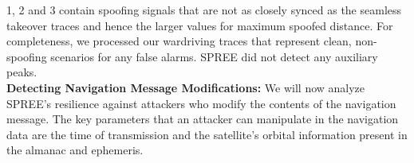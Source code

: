 \documentclass[letterpaper,twocolumn,10pt]{article}
\newcommand{\rxname}{SPREE\xspace}
\begin{document}
1, 2 and 3 contain spoofing signals that are not as closely synced as the seamless takeover traces and hence the larger values for maximum spoofed distance. For completeness, we processed our wardriving traces that represent clean, non-spoofing scenarios for any false alarms. \rxname did not detect any auxiliary peaks.\\



\noindent\textbf{Detecting Navigation Message Modifications:} We will now analyze \rxname's resilience against attackers who modify the contents of the navigation message. The key parameters that an attacker can manipulate in the navigation data are the time of transmission and the satellite's orbital information present in the almanac and ephemeris.\\ 
\end{document}
